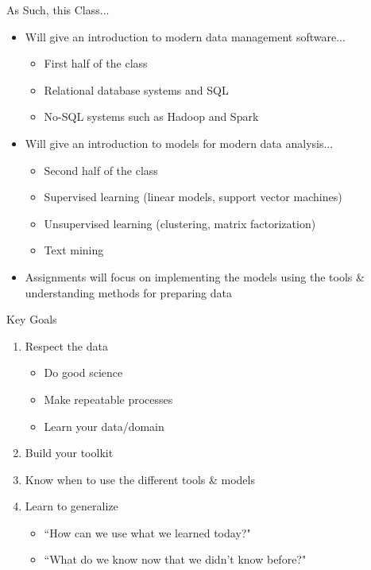 \documentclass[aspectratio=169]{beamer}
\begin{document}
\begin{frame}{As Such, this Class...}
    \begin{itemize}
\item Will give an introduction to modern data management software...
	\begin{itemize}
	\item First half of the class
	\item Relational database systems and SQL
	\item No-SQL systems such as Hadoop and Spark
	\end{itemize}
\item Will give an introduction to models for modern data analysis... 
	\begin{itemize}
	\item Second half of the class
	\item Supervised learning (linear models, support vector machines)
	\item Unsupervised learning (clustering, matrix factorization)
	\item Text mining
	\end{itemize}
\item Assignments will focus on implementing the models using the tools \& understanding methods for preparing data
    \end{itemize}

\end{frame}
\begin{frame}{Key Goals}

\begin{enumerate}
	\item Respect the data
\begin{itemize}
	\item Do good science
	\item Make repeatable processes
	\item Learn your data/domain
\end{itemize}
	\item Build your toolkit
	\item Know when to use the different tools \& models
	\item Learn to generalize
\begin{itemize}
	\item ``How can we use what we learned today?"
	\item ``What do we know now that we didn't know before?"
\end{itemize}
\end{enumerate}
\end{frame}
\end{document}
